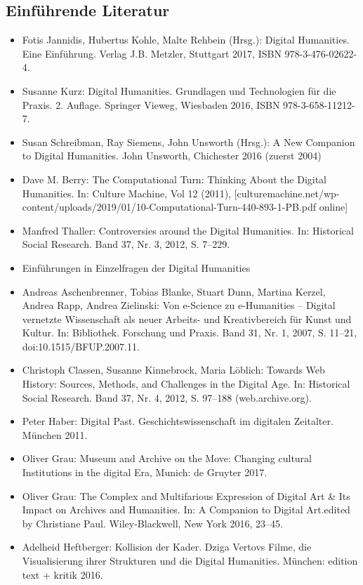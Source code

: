 \documentclass{article}
\begin{document}
\subsection{Einführende Literatur}
\begin{itemize}
\item Fotis Jannidis, Hubertus Kohle, Malte Rehbein (Hrsg.): Digital Humanities. Eine Einführung. Verlag J.B. Metzler, Stuttgart 2017, ISBN 978-3-476-02622-4.
\item Susanne Kurz: Digital Humanities. Grundlagen und Technologien für die Praxis. 2. Auflage. Springer Vieweg, Wiesbaden 2016, ISBN 978-3-658-11212-7.
\item Susan Schreibman, Ray Siemens, John Unsworth (Hrsg.): A New Companion to Digital Humanities. John Unsworth, Chichester 2016 (zuerst 2004)
\item Dave M. Berry: The Computational Turn: Thinking About the Digital Humanities. In: Culture Machine, Vol 12 (2011), [culturemachine.net/wp-content/uploads/2019/01/10-Computational-Turn-440-893-1-PB.pdf online]
\item Manfred Thaller: Controversies around the Digital Humanities. In: Historical Social Research. Band 37, Nr. 3, 2012, S. 7–229.
\item Einführungen in Einzelfragen der Digital Humanities
\item Andreas Aschenbrenner, Tobias Blanke, Stuart Dunn, Martina Kerzel, Andrea Rapp, Andrea Zielinski: Von e-Science zu e-Humanities – Digital vernetzte Wissenschaft als neuer Arbeits- und Kreativbereich für Kunst und Kultur. In: Bibliothek. Forschung und Praxis. Band 31, Nr. 1, 2007, S. 11–21, doi:10.1515/BFUP.2007.11.
\item Christoph Classen, Susanne Kinnebrock, Maria Löblich: Towards Web History: Sources, Methods, and Challenges in the Digital Age. In: Historical Social Research. Band 37, Nr. 4, 2012, S. 97–188 (web.archive.org).
\item Peter Haber: Digital Past. Geschichtswissenschaft im digitalen Zeitalter. München 2011.
\item Oliver Grau: Museum and Archive on the Move: Changing cultural Institutions in the digital Era, Munich: de Gruyter 2017.
\item Oliver Grau: The Complex and Multifarious Expression of Digital Art & Its Impact on Archives and Humanities. In: A Companion to Digital Art.edited by Christiane Paul. Wiley-Blackwell, New York 2016, 23–45.
\item Adelheid Heftberger: Kollision der Kader. Dziga Vertovs Filme, die Visualisierung ihrer Strukturen und die Digital Humanities. München: edition text + kritik 2016.

\end{itemize}
\end{document}
